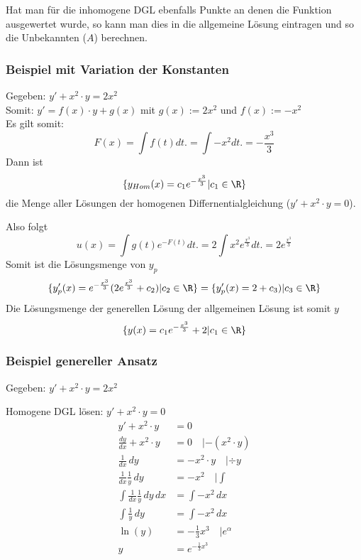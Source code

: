Hat man für die inhomogene DGL ebenfalls Punkte an denen die Funktion ausgewertet wurde,
so kann man dies in die allgemeine Lösung eintragen und so die Unbekannten ($A$) berechnen.

\subsubsection{Beispiel mit Variation der Konstanten}
Gegeben: $y' + x^2 \cdot y = 2x^2$\\
Somit:  $y' = f(x) \cdot y + g(x)$ mit $g(x) := 2x^2$ und $f(x) :=  - x^2$\\
Es gilt somit:\[
F(x) = \int f(t) dt. =  \int - x^2 dt. = -\frac{x^3}{3}
\]
Dann ist \[
\{y_{Hom}(x) = c_1e^{-\frac{x^3}{3}}| c_1 \in \R\}
\] die Menge aller Lösungen der homogenen Differnentialgleichung ($y' + x^2\cdot y = 0$). \\


Also folgt\[
u(x) = \int  g(t)e^{-F(t)} dt. =  2 \int  x^2e^{\frac{x^3}{3}} dt. = 2e^{\frac{x^3}{3}}
\]
Somit ist die Lösungsmenge von $y_p$
\[
\{ y_p'(x) = e^{-\frac{x^3}{3}} (2e^{\frac{x^3}{3}} + c_2) | c_2 \in \R \}
= \{ y_p'(x) =2 + c_3) | c_3 \in \R \}
\]
Die Lösungsmenge der generellen Lösung der allgemeinen Lösung ist somit $y$\[
\{ y(x) =  c_1e^{-\frac{x^3}{3}} +  2  | c_1 \in \R \}
\]

\subsubsection{Beispiel genereller Ansatz}
Gegeben: $y' + x^2 \cdot y = 2x^2$

Homogene DGL lösen: $y' + x^2 \cdot y = 0$
\begin{align*}
y' + x^2 \cdot y &= 0\\
\frac{dy}{dx} + x^2 \cdot y &= 0 \quad | -(x^2 \cdot y)\\
\frac{1}{dx}\, dy &= -x^2 \cdot y \quad | \div y\\
\frac{1}{dx} \frac{1}{y} \, dy &= -x^2 \quad | \int\\
\int \frac{1}{dx} \frac{1}{y} \, dy \, dx &= \int -x^2 \, dx\\
\int \frac{1}{y}\, dy &= \int -x^2 \, dx\\
\ln(y) &= -\frac{1}{3} x^3 \quad | e^\alpha\\
y &= e^{-\frac{1}{3}x^3}
\end{align*}

